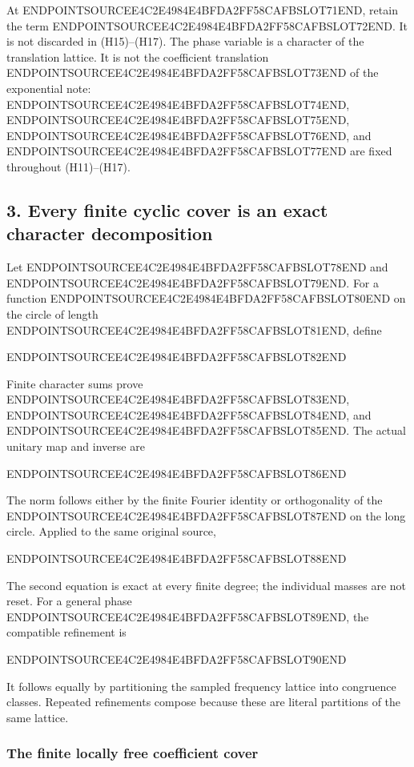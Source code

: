 At ENDPOINTSOURCEE4C2E4984E4BFDA2FF58CAFBSLOT71END, retain the term ENDPOINTSOURCEE4C2E4984E4BFDA2FF58CAFBSLOT72END. It is not discarded in (H15)--(H17). The phase variable is a character of the translation lattice. It is not the coefficient translation ENDPOINTSOURCEE4C2E4984E4BFDA2FF58CAFBSLOT73END of the exponential note: ENDPOINTSOURCEE4C2E4984E4BFDA2FF58CAFBSLOT74END, ENDPOINTSOURCEE4C2E4984E4BFDA2FF58CAFBSLOT75END, ENDPOINTSOURCEE4C2E4984E4BFDA2FF58CAFBSLOT76END, and ENDPOINTSOURCEE4C2E4984E4BFDA2FF58CAFBSLOT77END are fixed throughout (H11)--(H17).

\subsection{3. Every finite cyclic cover is an exact character decomposition}\label{endpoint-holonomy_original--every-finite-cyclic-cover-is-an-exact-character-decomposition}

Let ENDPOINTSOURCEE4C2E4984E4BFDA2FF58CAFBSLOT78END and ENDPOINTSOURCEE4C2E4984E4BFDA2FF58CAFBSLOT79END. For a function ENDPOINTSOURCEE4C2E4984E4BFDA2FF58CAFBSLOT80END on the circle of length ENDPOINTSOURCEE4C2E4984E4BFDA2FF58CAFBSLOT81END, define

ENDPOINTSOURCEE4C2E4984E4BFDA2FF58CAFBSLOT82END

Finite character sums prove ENDPOINTSOURCEE4C2E4984E4BFDA2FF58CAFBSLOT83END, ENDPOINTSOURCEE4C2E4984E4BFDA2FF58CAFBSLOT84END, and ENDPOINTSOURCEE4C2E4984E4BFDA2FF58CAFBSLOT85END. The actual unitary map and inverse are

ENDPOINTSOURCEE4C2E4984E4BFDA2FF58CAFBSLOT86END

The norm follows either by the finite Fourier identity or orthogonality of the ENDPOINTSOURCEE4C2E4984E4BFDA2FF58CAFBSLOT87END on the long circle. Applied to the same original source,

ENDPOINTSOURCEE4C2E4984E4BFDA2FF58CAFBSLOT88END

The second equation is exact at every finite degree; the individual masses are not reset. For a general phase ENDPOINTSOURCEE4C2E4984E4BFDA2FF58CAFBSLOT89END, the compatible refinement is

ENDPOINTSOURCEE4C2E4984E4BFDA2FF58CAFBSLOT90END

It follows equally by partitioning the sampled frequency lattice into congruence classes. Repeated refinements compose because these are literal partitions of the same lattice.

\subsubsection{The finite locally free coefficient cover}\label{endpoint-holonomy_original--the-finite-locally-free-coefficient-cover}

